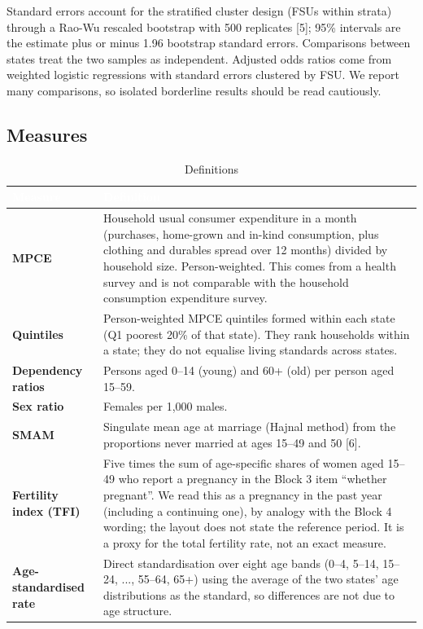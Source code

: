 \documentclass[10pt,a4paper]{article}
\begin{document}
Standard errors account for the stratified cluster design (FSUs within strata) through a Rao-Wu rescaled bootstrap with 500 replicates [5]; 95\% intervals are the estimate plus or minus 1.96 bootstrap standard errors. Comparisons between states treat the two samples as independent. Adjusted odds ratios come from weighted logistic regressions with standard errors clustered by FSU. We report many comparisons, so isolated borderline results should be read cautiously.


\subsection{Measures}

\begin{table}[!htb]\centering
\caption{Definitions}
\begin{tabular}{>{\raggedright\arraybackslash}p{3.42cm}>{\raggedright\arraybackslash}p{13.02cm}}
\toprule
\rowcolor{navy}\textcolor{white}{\textbf{Measure}} & \textcolor{white}{\textbf{Definition}} \\
\midrule
\textbf{MPCE} & Household usual consumer expenditure in a month (purchases, home-grown and in-kind consumption, plus clothing and durables spread over 12 months) divided by household size. Person-weighted. This comes from a health survey and is not comparable with the household consumption expenditure survey. \\
\textbf{Quintiles} & Person-weighted MPCE quintiles formed within each state (Q1 poorest 20\% of that state). They rank households within a state; they do not equalise living standards across states. \\
\textbf{Dependency ratios} & Persons aged 0--14 (young) and 60+ (old) per person aged 15--59. \\
\textbf{Sex ratio} & Females per 1,000 males. \\
\textbf{SMAM} & Singulate mean age at marriage (Hajnal method) from the proportions never married at ages 15--49 and 50 [6]. \\
\textbf{Fertility index (TFI)} & Five times the sum of age-specific shares of women aged 15--49 who report a pregnancy in the Block 3 item ``whether pregnant''. We read this as a pregnancy in the past year (including a continuing one), by analogy with the Block 4 wording; the layout does not state the reference period. It is a proxy for the total fertility rate, not an exact measure. \\
\textbf{Age-standardised rate} & Direct standardisation over eight age bands (0--4, 5--14, 15--24, ..., 55--64, 65+) using the average of the two states' age distributions as the standard, so differences are not due to age structure. \\

\end{tabular}
\end{table}
\end{document}
